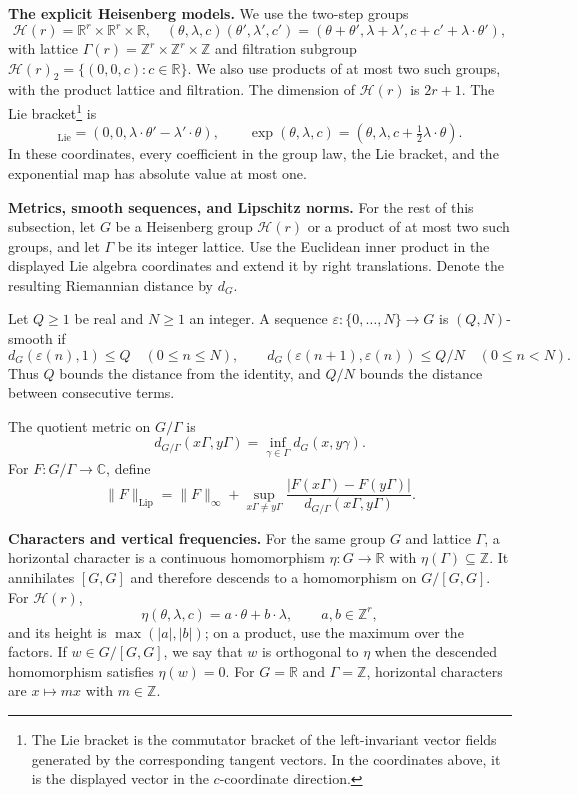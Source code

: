 \documentclass[twoside]{aomart}
\theoremstyle{paperplain}
\theoremstyle{paperdefinition}
\numberwithin{equation}{section}
\begin{document}
\medskip
\noindent\textbf{The explicit Heisenberg models.}
We use the two-step groups
\begin{equation}
 \mathcal H(r)=\mathbb R^r\times\mathbb R^r\times\mathbb R,
 \quad
 (\theta,\lambda,c)(\theta',\lambda',c')
 =(\theta+\theta',\lambda+\lambda',c+c'+\lambda\cdot\theta'),
 \label{inv:group-definition}
\end{equation}
with lattice
$\Gamma(r)=\mathbb Z^r\times\mathbb Z^r\times\mathbb Z$ and
filtration subgroup
$\mathcal H(r)_2=\{(0,0,c):c\in\mathbb R\}$. We also use products
of at most two such groups, with the product lattice and filtration.
The dimension of $\mathcal H(r)$ is $2r+1$. The Lie bracket\footnote{The Lie bracket is the commutator bracket of the left-invariant
vector fields generated by the corresponding tangent vectors. In the
coordinates above, it is the displayed vector in the $c$-coordinate
direction.} is
\begin{equation*}
 [(\theta,\lambda,c),(\theta',\lambda',c')]_{\mathrm{Lie}}
 =(0,0,\lambda\cdot\theta'-\lambda'\cdot\theta),
 \qquad
 \exp(\theta,\lambda,c)
 =(\theta,\lambda,c+\tfrac12\lambda\cdot\theta).
\end{equation*}
In these coordinates, every coefficient in the group law, the Lie
bracket, and the exponential map has absolute value at most one.

\medskip
\noindent\textbf{Metrics, smooth sequences, and Lipschitz norms.}
For the rest of this subsection, let $G$ be a Heisenberg group
$\mathcal H(r)$ or a product of at most two such groups, and let
$\Gamma$ be its integer lattice. Use the Euclidean inner product
in the displayed Lie algebra coordinates and extend it by right
translations. Denote the resulting Riemannian distance by $d_G$.

Let $Q\ge1$ be real and $N\ge1$ an integer. A sequence
$\varepsilon:\{0,\ldots,N\}\to G$ is $(Q,N)$-smooth if
\[
 d_G(\varepsilon(n),1)\le Q\quad(0\le n\le N),\qquad
 d_G(\varepsilon(n+1),\varepsilon(n))\le Q/N
 \quad(0\le n<N).
\]
Thus $Q$ bounds the distance from the identity, and $Q/N$ bounds
the distance between consecutive terms.

The quotient metric on $G/\Gamma$ is
\[
 d_{G/\Gamma}(x\Gamma,y\Gamma)
   =\inf_{\gamma\in\Gamma}d_G(x,y\gamma).
\]
For $F:G/\Gamma\to\mathbb C$, define
\[
 \|F\|_{\mathrm{Lip}}
 =\|F\|_\infty+
 \sup_{x\Gamma\ne y\Gamma}
 \frac{|F(x\Gamma)-F(y\Gamma)|}
      {d_{G/\Gamma}(x\Gamma,y\Gamma)}.
\]

\medskip
\noindent\textbf{Characters and vertical frequencies.}
For the same group $G$ and lattice $\Gamma$, a horizontal character
is a continuous homomorphism
$\eta:G\to\mathbb R$ with $\eta(\Gamma)\subseteq\mathbb Z$.
It annihilates $[G,G]$ and therefore descends to a homomorphism on
$G/[G,G]$. For $\mathcal H(r)$,
\[
 \eta(\theta,\lambda,c)=a\cdot\theta+b\cdot\lambda,
 \qquad a,b\in\mathbb Z^r,
\]
and its height is $\max(|a|,|b|)$; on a product, use the maximum over
the factors. If $w\in G/[G,G]$, we say that $w$ is orthogonal to
$\eta$ when the descended homomorphism satisfies $\eta(w)=0$.
For $G=\mathbb R$ and $\Gamma=\mathbb Z$, horizontal characters
are $x\mapsto mx$ with $m\in\mathbb Z$.
\end{document}
